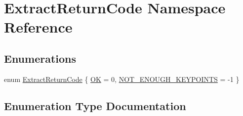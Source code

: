 \hypertarget{namespaceExtractReturnCode}{}\section{Extract\+Return\+Code Namespace Reference}
\label{namespaceExtractReturnCode}
\subsection*{Enumerations}
\begin{DoxyCompactItemize}
\item 
enum \hyperlink{namespaceExtractReturnCode_a88d3d56de717f250bf48793769dd57ba}{Extract\+Return\+Code} \{ \hyperlink{namespaceExtractReturnCode_a88d3d56de717f250bf48793769dd57baa35e3ef3fef8fcb5cc35f89bcdbf50d5a}{OK} = 0, 
\hyperlink{namespaceExtractReturnCode_a88d3d56de717f250bf48793769dd57baacc16e5e7772072e33bf927abd7c422c6}{N\+O\+T\+\_\+\+E\+N\+O\+U\+G\+H\+\_\+\+K\+E\+Y\+P\+O\+I\+N\+TS} = -\/1
 \}
\end{DoxyCompactItemize}


\subsection{Enumeration Type Documentation}
